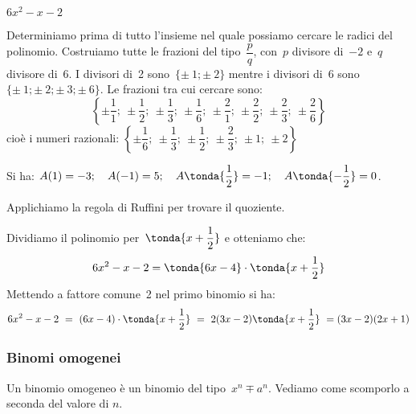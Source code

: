\begin{esempio}
\(6x^2-x-2\)

Determiniamo prima di tutto l'insieme nel quale
possiamo cercare le radici del polinomio. Costruiamo tutte le frazioni
del tipo~\(\dfrac{p}{q}\), con~\(p\) divisore di~\(-2\) e~\(q\) divisore 
di~\(6\). I
divisori di~2 sono~\(\{\pm~1;\pm~2\}\) 
mentre i divisori di~6 sono~\(\{\pm~1;\pm~2;\pm~3;\pm~6\}\).
Le frazioni tra cui cercare sono:
\[\left\{
\pm \dfrac{1}{1};~\pm \dfrac{1}{2};~\pm \dfrac{1}{3};~\pm \dfrac{1}{6};~
\pm \dfrac{2}{1};~\pm \dfrac{2}{2};~\pm \dfrac{2}{3};~\pm \dfrac{2}{6}\right\}\]
cioè i numeri razionali: \quad
\(\left\{
\pm \dfrac{1}{6};~\pm \dfrac{1}{3};~\pm \dfrac{1}{2};~\pm \dfrac{2}{3};~
\pm 1;~\pm 2 \right\}\)

Si ha: \quad \(A(1)=-3; \quad A(-1)=5; \quad A\tonda{\dfrac{1}{2}}=-1; 
       \quad A\tonda{-\dfrac{1}{2}}=0\).
       
Applichiamo la regola di Ruffini per trovare il quoziente.


{
Dividiamo il polinomio per~\(\tonda{x+\dfrac{1}{2}}\) e otteniamo che:
\vspace{-2mm}
\[6x^2-x-2 = \tonda{6x-4} \cdot \tonda{x+\dfrac{1}{2}}\]
}
{
\hspace{5mm} \scompruffinid 
}
Mettendo a fattore comune~2 nel primo binomio si ha:
\[6x^2-x-2\ =
\ (6x-4)\cdot \tonda{x+\dfrac{1}{2}}\ =
\ 2(3x-2)\tonda{x+\dfrac{1}{2}}\ =(3x-2)(2x+1)\]
\end{esempio}




\subsubsection{Binomi omogenei}
\label{subsubsec:divpol_binomo}

Un binomio omogeneo è un binomio del tipo~\(x^{n} \mp a^{n}\).
Vediamo come scomporlo a seconda del valore di \(n\).

